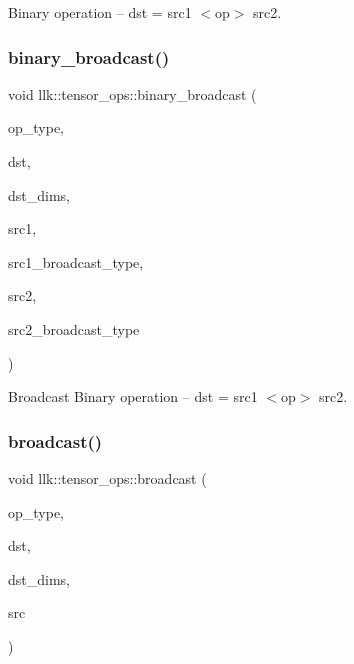 Binary operation -- dst = src1 $<$op$>$ src2. 

\mbox{\label{namespacellk_1_1tensor__ops_aecac6c5bbeaf3abf3e5a3c7e325728bc}} 
\subsubsection{\texorpdfstring{binary\+\_\+broadcast()}{binary\_broadcast()}}
{\footnotesize\ttfamily void llk\+::tensor\+\_\+ops\+::binary\+\_\+broadcast (\begin{DoxyParamCaption}\item[{\hyperlink{namespacellk_1_1tensor__ops_a255b8a4e49bc956c2731c62bf613c0f8}{binary\+\_\+op}}]{op\+\_\+type,  }\item[{\hyperlink{classllk_1_1Tensor}{llk\+::\+Tensor} \&}]{dst,  }\item[{\hyperlink{structllk_1_1TensorDims}{llk\+::\+Tensor\+Dims}}]{dst\+\_\+dims,  }\item[{\hyperlink{classllk_1_1Tensor}{llk\+::\+Tensor} \&}]{src1,  }\item[{\hyperlink{namespacellk_1_1tensor__ops_ac43a7c3eb367c669baaa45a327aeca58}{broadcast\+\_\+op}}]{src1\+\_\+broadcast\+\_\+type,  }\item[{\hyperlink{classllk_1_1Tensor}{llk\+::\+Tensor} \&}]{src2,  }\item[{\hyperlink{namespacellk_1_1tensor__ops_ac43a7c3eb367c669baaa45a327aeca58}{broadcast\+\_\+op}}]{src2\+\_\+broadcast\+\_\+type }\end{DoxyParamCaption})}



Broadcast Binary operation -- dst = src1 $<$op$>$ src2. 

\mbox{\label{namespacellk_1_1tensor__ops_a95e1bfff1cd795053d5686fd418213e8}} 
\subsubsection{\texorpdfstring{broadcast()}{broadcast()}}
{\footnotesize\ttfamily void llk\+::tensor\+\_\+ops\+::broadcast (\begin{DoxyParamCaption}\item[{\hyperlink{namespacellk_1_1tensor__ops_ac43a7c3eb367c669baaa45a327aeca58}{broadcast\+\_\+op}}]{op\+\_\+type,  }\item[{\hyperlink{classllk_1_1Tensor}{llk\+::\+Tensor} \&}]{dst,  }\item[{\hyperlink{structllk_1_1TensorDims}{llk\+::\+Tensor\+Dims}}]{dst\+\_\+dims,  }\item[{\hyperlink{classllk_1_1Tensor}{llk\+::\+Tensor} \&}]{src }\end{DoxyParamCaption})}



